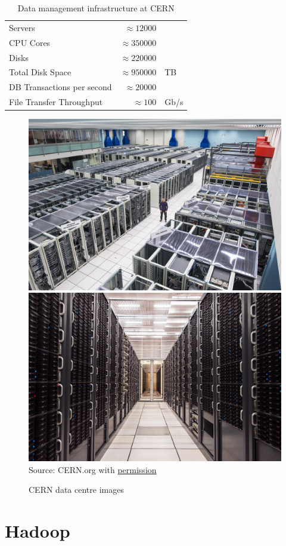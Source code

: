 \begin{table}
\centering

\renewcommand{\arraystretch}{1.25}
\begin{tabular}{l r l} \hline
Servers & $\approx 12000$ \\
CPU Cores & $\approx 350000$ \\
Disks & $\approx 220000$ \\
Total Disk Space & $\approx 950000$ & TB \\ 
DB Transactions per second & $\approx 20000$ \\ 
File Transfer Throughput & $\approx 100$ & Gb/s\\  \hline
\end{tabular}
\caption[Data management infrastructure at CERN]{Data management infrastructure at CERN\footnotemark}
\label{tab:cern}
\end{table}

\begin{figure}
\centering

\includegraphics[width=.45\textwidth]{cern1.jpg} \hfill
\includegraphics[width=.45\textwidth]{cern2.jpg} \\

\scriptsize Source: CERN.org with \href{https://copyright.web.cern.ch/}{permission} \normalsize
\caption{CERN data centre images}
\label{fig:cerndata}
\end{figure}

\FloatBarrier

\section{Hadoop}

